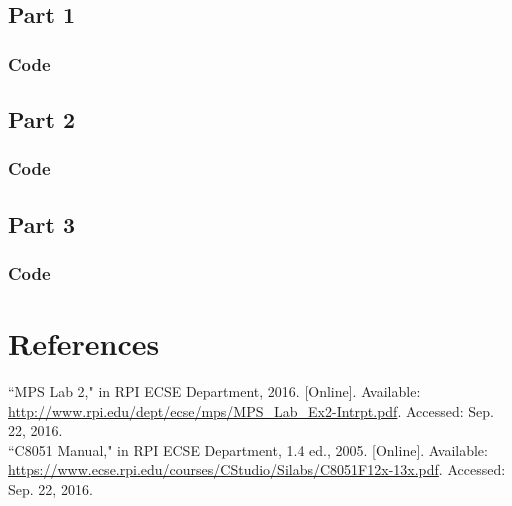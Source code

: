 \documentclass[12pt]{article}
\begin{document}
\subsection{Part 1}
	\subsubsection{Code}
		
\subsection{Part 2}
	\subsubsection{Code}
			

\subsection{Part 3}
	\subsubsection{Code}
		
	
\section{References} 
\noindent
``MPS Lab 2," in RPI ECSE Department, 2016. [Online]. Available: \url{http://www.rpi.edu/dept/ecse/mps/MPS_Lab_Ex2-Intrpt.pdf}. Accessed: Sep. 22, 2016.\\
\newline\noindent
``C8051 Manual," in RPI ECSE Department, 1.4 ed., 2005. [Online]. Available: \url{https://www.ecse.rpi.edu/courses/CStudio/Silabs/C8051F12x-13x.pdf}. Accessed: Sep. 22, 2016.
\end{document}
